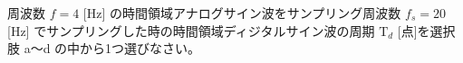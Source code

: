 周波数 $f = 4$ [Hz] の時間領域アナログサイン波をサンプリング周波数 $f_s = 20$ [Hz] でサンプリングした時の時間領域ディジタルサイン波の周期 $\textrm{T}_d$ [点]を選択肢 a〜d の中から1つ選びなさい。
